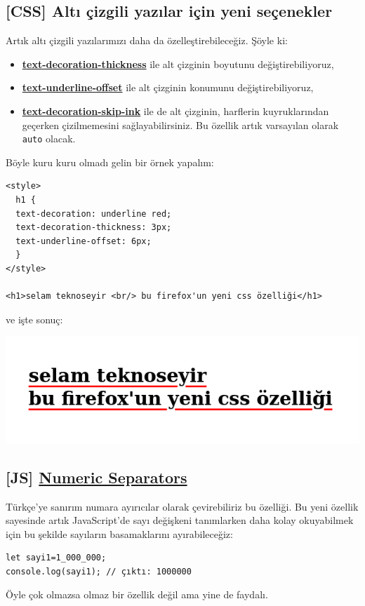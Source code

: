 \documentclass[11pt]{article}
\begin{document}
\subsection{[CSS] Altı çizgili yazılar için yeni seçenekler}
\label{sec:org9a4d115}
Artık altı çizgili yazılarımızı daha da özelleştirebileceğiz. Şöyle ki:
\begin{itemize}
\item \textbf{\href{https://developer.mozilla.org/en-US/docs/Web/CSS/text-decoration-thickness}{text-decoration-thickness}} ile alt çizginin boyutunu değiştirebiliyoruz,
\item \textbf{\href{https://developer.mozilla.org/en-US/docs/Web/CSS/text-underline-offset}{text-underline-offset}} ile alt çizginin konumunu değiştirebiliyoruz,
\item \textbf{\href{https://developer.mozilla.org/en-US/docs/Web/CSS/text-decoration-skip-ink}{text-decoration-skip-ink}} ile de alt çizginin, harflerin kuyruklarından
geçerken çizilmemesini sağlayabilirsiniz. Bu özellik artık varsayılan
olarak \texttt{auto} olacak.
\end{itemize}
Böyle kuru kuru olmadı gelin bir örnek yapalım:
\begin{verbatim}
<style>
  h1 {
  text-decoration: underline red;
  text-decoration-thickness: 3px;
  text-underline-offset: 6px;
  }
</style>

<h1>selam teknoseyir <br/> bu firefox'un yeni css özelliği</h1>
\end{verbatim}

ve işte sonuç:

\begin{center}
\includegraphics[width=.9\linewidth]{gorseller/firefox-yeni-css.png}
\end{center}
\subsection{[JS] \href{https://developer.mozilla.org/en-US/docs/Web/JavaScript/Reference/Lexical\_grammar\#Numeric\_separators}{Numeric Separators}}
\label{sec:orge3c5143}
Türkçe'ye sanırım numara ayırıcılar olarak çevirebiliriz bu özelliği. Bu yeni
özellik sayesinde artık JavaScript'de sayı değişkeni tanımlarken daha kolay
okuyabilmek için bu şekilde sayıların basamaklarını ayırabileceğiz:
\begin{verbatim}
let sayi1=1_000_000;
console.log(sayi1); // çıktı: 1000000
\end{verbatim}
Öyle çok olmazsa olmaz bir özellik değil ama yine de faydalı.
\end{document}
